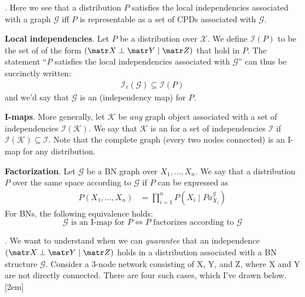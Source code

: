 \documentclass[11pt]{article}
\newcommand\myspace[1][]{\vspace{#1\bigskipamount}}
\newcommand\p{\Needspace{10\baselineskip} \noindent}
\begin{document}
\myspace
\p {}. Here we see that a distribution $P$ satisfies the local independencies associated with a graph $\mathcal G$ iff $P$ is representable as a set of CPDs associated with $\mathcal G$.  
\begin{compactitem}
	\item \textbf{Local independencies}. Let $P$ be a distribution over $\mathcal{X}$. We define $\mathcal I (P)$ to be the set of  of the form $(\matr X \perp \matr Y \mid \matr Z)$ that hold in $P$. The statement ``$P$ satisfies the local independencies associated with $\mathcal G$'' can thus be succinctly written:
	\begin{align}
		\mathcal{I}_{\ell}(\mathcal G) \subseteq \mathcal{I}(P)
	\end{align}
	and we'd say that $\mathcal G$ is an  (independency map) for $P$. 
	
	\item \textbf{I-maps}. More generally, let $\mathcal K$ be \textit{any} graph object associated with a set of independencies $\mathcal I(\mathcal K)$. We say that $\mathcal K$ is an  for a set of independencies $\mathcal I$ if $\mathcal I(\mathcal K) \subseteq \mathcal I$. Note that the complete graph (every two nodes connected) is an I-map for any distribution. 
	
	\item \textbf{Factorization}. Let $\mathcal G$ be a BN graph over $X_1, \ldots, X_n$. We say that a distribution $P$ over the same space  according to $\mathcal G$ if $P$ can be expressed as 
	\begin{align}
		P(X_1, \ldots, X_n) &= \prod_{i = 1}^n P(X_i \mid Pa_{X_i}^{\mathcal G})
	\end{align}
	For BNs, the following equivalence holds: 
	$$
		\mathcal G \text{ is an I-map for } P \iff P \text{ factorizes according to } \mathcal G
	$$
	
\end{compactitem}

\myspace
\p {}. We want to understand when we can \textit{guarantee} that an independence $(\matr X \perp \matr Y \mid \matr Z)$ holds in a distribution associated with a BN structure $\mathcal G$. Consider a 3-node network consisting of X, Y, and Z, where X and Y are not directly connected. There are four such cases, which I've drawn below.[2em]
\end{document}
